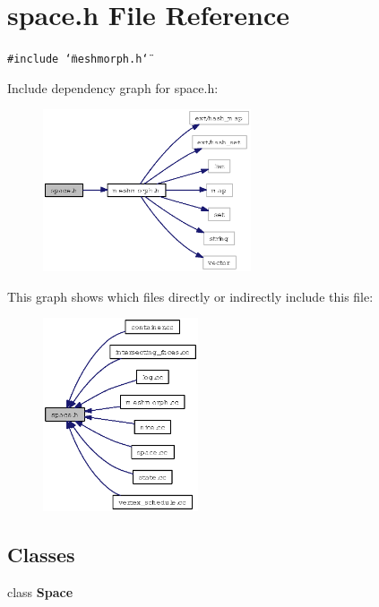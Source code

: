 \section{space.h File Reference}
\label{space_8h}
{\tt \#include \char`\"{}meshmorph.h\char`\"{}}\par


Include dependency graph for space.h:\begin{figure}[H]
\begin{center}
\leavevmode
\includegraphics[width=174pt]{space_8h__incl}
\end{center}
\end{figure}


This graph shows which files directly or indirectly include this file:\begin{figure}[H]
\begin{center}
\leavevmode
\includegraphics[width=130pt]{space_8h__dep__incl}
\end{center}
\end{figure}
\subsection*{Classes}
\begin{CompactItemize}
\item 
class {\bf Space}
\end{CompactItemize}
